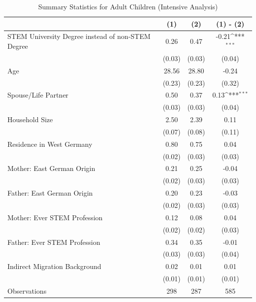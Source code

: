 \documentclass[a4paper, oneside, hyperfootnotes = false]{article}
\def\sym#1{\ifmmode^{#1}\else\(^{#1}\)\fi}
\begin{document}
{\begin{table}[ht]
	\caption{Summary Statistics for Adult Children (Intensive Analysis)}
	\label{tab:descr_summary_epid_int}
	\begin{center}
		\begin{tabular}{l*{3}{c}}
			\toprule
			& (1) & (2) & (1) - (2) \\
			\midrule
			STEM University Degree instead of non-STEM Degree & 0.26  & 0.47  &  -0.21\sym{***}   \\
			&   (0.03)  & (0.03) & (0.04) \\
			\addlinespace
			Age         &  28.56    &  28.80   &   -0.24   \\
			&     (0.23) &        (0.23)         &      (0.32) \\
			\addlinespace
			Spouse/Life Partner &   0.50    & 0.37  &  0.13\sym{***}     \\
			&      (0.03)&          (0.03)&         (0.04) \\
			\addlinespace
			Household Size      &  2.50   &  2.39   &      0.11     \\
			&          (0.07)&       (0.08)   &   (0.11) \\
			\addlinespace
			Residence in West Germany  &  0.80   &  0.75   &   0.04   \\
			&         (0.02) &       (0.03)&  (0.03)\\
			\addlinespace
			Mother: East German Origin &  0.21   & 0.25    &   -0.04      \\
			&         (0.02) &   (0.03)&  (0.03)\\
			\addlinespace
			Father: East German Origin &  0.20   &  0.23   &   -0.03      \\
			&         (0.02) &       (0.03)&  (0.03)\\
			\addlinespace
			Mother: Ever STEM Profession & 0.12   &  0.08   & 0.04    \\
			&         (0.02) &       (0.02) &  (0.03) \\
			\addlinespace
			Father: Ever STEM Profession &  0.34   & 0.35    & -0.01    \\
			&         (0.03) &       (0.03)&  (0.04)\\
			\addlinespace
			Indirect Migration Background &   0.02  &  0.01   &  0.01    \\
			&         (0.01) &       (0.01)&  (0.01) \\
			\midrule
			Observations        &  298     &  287     &        585            \\
			\bottomrule
		\end{tabular}
		

\end{center}
\end{table}}
\end{document}
